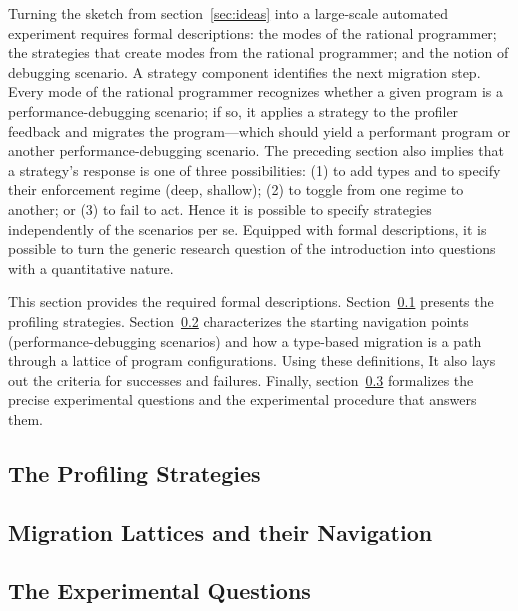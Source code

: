 
Turning the sketch from section~\ref{sec:ideas} into a large-scale automated
experiment requires formal descriptions: the modes of the rational programmer;
the strategies that create modes from the rational programmer; and the notion of
debugging scenario. A strategy component identifies the next migration step.
Every mode of the rational programmer recognizes whether a given program is a
performance-debugging scenario; if so, it applies a strategy to the profiler
feedback and migrates the program---which should yield a performant program or
another performance-debugging scenario.  The preceding section also implies that
a strategy's response is one of three possibilities: (1) to add types and to
specify their enforcement regime (deep, shallow); (2) to toggle from one regime
to another; or (3) to fail to act. Hence it is possible to specify strategies
independently of the scenarios per se. Equipped with formal descriptions, it is
possible to turn the generic research question of the introduction into
questions with a quantitative nature.

This section provides the required formal descriptions.
Section~\ref{subsec:strategies} presents the profiling strategies.
Section~\ref{subsec:lattice} characterizes the starting navigation points
(performance-debugging scenarios)
and how a type-based migration is a
path through a lattice of program configurations. Using these definitions, It
also lays out the criteria for successes and failures. Finally,
section~\ref{subsec:questions} formalizes the precise experimental questions and
the experimental procedure that answers them.


\def\exp#1#2{\subsection{#2} \label{subsec:#1} }

\exp{strategies}{The Profiling Strategies}
\exp{lattice}{Migration Lattices and their Navigation}
\exp{questions}{The Experimental Questions}
